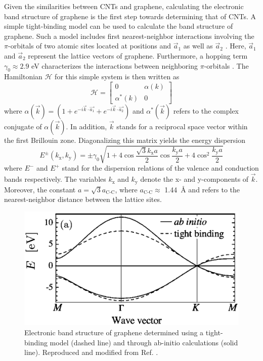 Given the similarities between CNTs and graphene, calculating the electronic band structure of graphene is the first step towards determining that of CNTs. A simple tight-binding model can be used to calculate the band structure of graphene. Such a model includes first nearest-neighbor interactions involving the $\pi$-orbitals of two atomic sites located at positions and $\vec{a}_1$ as well as $\vec{a}_2$ \cite{charlier2007electronic}. Here, $\vec{a}_1$ and $\vec{a}_2$ represent the lattice vectors of graphene. Furthermore, a hopping term $\gamma_0 \approx 2.9$ eV  characterizes the interactions between neighboring $\pi$-orbitals \cite{charlier2007electronic}. The Hamiltonian $\mathcal{H}$ for this simple system is then written as
%
\begin{equation}
	\mathcal{H} = \begin{bmatrix}
	0 & \alpha(k) \\
	\alpha^*(k) & 0
	\end{bmatrix}
\end{equation}
%
where $\alpha(\vec{k}) = (1 + e^{-i \vec{k}\cdot \vec{a_1}} + e^{-i \vec{k}\cdot \vec{a_2}})$ and $\alpha^*(\vec{k})$ refers to the complex conjugate of $\alpha(\vec{k})$\cite{charlier2007electronic}. In addition, $\vec{k}$ stands for a reciprocal space vector within the first Brillouin zone. Diagonalizing this matrix yields the energy dispersion
%
\begin{equation}
	E^{\pm} (k_\text{x}, k_\text{y}) = \pm \gamma_0 \sqrt{1 + 4 \cos\dfrac{\sqrt{3}k_\text{x} a}{2}\cos\dfrac{k_\text{y} a}{2} + 4 \cos^2 \dfrac{k_\text{y} a}{2}}
	\label{eq:graphene_band}
\end{equation}
 where $E^-$ and $E^+$ stand for the dispersion relations of the valence and conduction bands respectively. The variables $k_\text{x}$ and $k_\text{y}$ denote the x- and y-components of $\vec{k}$. Moreover, the constant $a = \sqrt{3}a_\text{C-C}$, where $a_\text{C-C} \approx$ \SI{1.44}{\angstrom} and refers to the nearest-neighbor distance between the lattice sites.
%
\begin{figure}[h]
	\centering
	\includegraphics[scale=0.5]{images/chapter_optical_props/graphene_band_charlier}
	\caption{Electronic band structure of graphene determined using a tight-binding model (dashed line) and through ab-initio calculations (solid line). Reproduced and modified from Ref. \cite{reich2002tight}.}
	\label{fig:graphene_band}
\end{figure}
